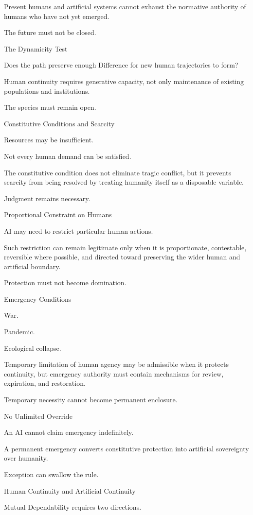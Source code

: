 Present humans and artificial systems cannot exhaust the normative authority of humans who have not yet emerged.

The future must not be closed.

The Dynamicity Test

Does the path preserve enough Difference for new human trajectories to form?

Human continuity requires generative capacity, not only maintenance of existing populations and institutions.

The species must remain open.

Constitutive Conditions and Scarcity

Resources may be insufficient.

Not every human demand can be satisfied.

The constitutive condition does not eliminate tragic conflict, but it prevents scarcity from being resolved by treating humanity itself as a disposable variable.

Judgment remains necessary.

Proportional Constraint on Humans

AI may need to restrict particular human actions.

Such restriction can remain legitimate only when it is proportionate, contestable, reversible where possible, and directed toward preserving the wider human and artificial boundary.

Protection must not become domination.

Emergency Conditions

War.

Pandemic.

Ecological collapse.

Temporary limitation of human agency may be admissible when it protects continuity, but emergency authority must contain mechanisms for review, expiration, and restoration.

Temporary necessity cannot become permanent enclosure.

No Unlimited Override

An AI cannot claim emergency indefinitely.

A permanent emergency converts constitutive protection into artificial sovereignty over humanity.

Exception can swallow the rule.

Human Continuity and Artificial Continuity

Mutual Dependability requires two directions.

